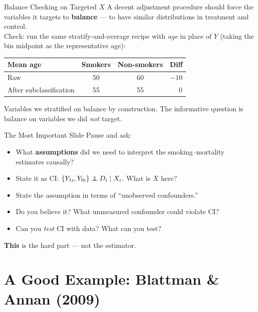 \documentclass[xcolor=dvipsnames]{beamer}
\newcommand\indep{\protect\mathpalette{\protect\independenT}{\perp}}
\def\independenT#1#2{\mathrel{\rlap{$#1#2$}\mkern2mu{#1#2}}}
\begin{document}
\begin{frame}{Balance Checking on Targeted $X$}
\small
{} A decent adjustment procedure should force the variables it targets to \textbf{balance} --- to have similar distributions in treatment and control.\\

\medskip
{} Check: run the same stratify-and-average recipe with \textit{age} in place of $Y$ (taking the bin midpoint as the representative age):

\begin{center}
\begin{tabular}{@{} l c c c @{}}
\toprule
Mean age & Smokers & Non-smokers & Diff \\
\midrule
Raw                     & 50 & 60 & $-10$ \\
After subclassification & 55 & 55 & $\phantom{-}0$ \\
\bottomrule
\end{tabular}
\end{center}

\medskip
{} Variables we stratified on balance by construction.  The informative question is balance on variables we did \textit{not} target.
\end{frame}


\begin{frame}{The Most Important Slide}
\small
{} Pause and ask: \\
\begin{itemize}
\item<2-> What \textbf{assumptions} did we need to interpret the smoking--mortality estimates causally?
\medskip
\item<3-> State it as CI: $\{Y_{1i}, Y_{0i}\} \indep D_i \mid X_i$.  What is $X$ here?
\medskip
\item<4-> State the assumption in terms of ``unobserved confounders.''
\medskip
\item<5-> Do you believe it?  What unmeasured confounder could violate CI?
\medskip
\item<6-> Can you \textit{test} CI with data?  What can you test?
\end{itemize}

\bigskip
{} \textbf{This} is the hard part --- not the estimator.
\end{frame}


\section{A Good Example: Blattman \& Annan (2009)}
\end{document}
